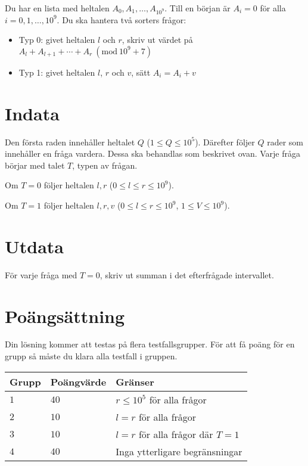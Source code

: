 \newcommand{\Mod}[1]{\ (\mathrm{mod}\ #1)}

Du har en lista med heltalen $A_0, A_1, \dots, A_{10^9}$. Till en början är $A_i=0$ för alla $i=0,1,\dots,10^9$.
Du ska hantera två sorters frågor:

\begin{itemize}
    \item Typ 0: givet heltalen $l$ och $r$, skriv ut värdet på  $A_l + A_{l+1} + \cdots + A_{r} \Mod{10^9+7}$
    \item Typ 1: givet heltalen $l$, $r$ och $v$, sätt $A_i=A_i+v$
\end{itemize}

\section*{Indata}
Den första raden innehåller heltalet $Q$ ($1 \leq Q \leq 10^5$).
Därefter följer $Q$ rader som innehåller en fråga vardera. Dessa ska behandlas som beskrivet ovan.
Varje fråga börjar med talet $T$, typen av frågan.

Om $T=0$ följer heltalen $l,r$ ($0 \leq l \leq r \leq 10^9$).

Om $T=1$ följer heltalen $l, r, v$ ($0 \leq l \leq r \leq 10^9$, $1 \leq V \leq 10^9$).

\section*{Utdata}
För varje fråga med $T=0$, skriv ut summan i det efterfrågade intervallet.

\section*{Poängsättning}
Din lösning kommer att testas på flera testfallsgrupper.
\noindent
För att få poäng för en grupp så måste du klara alla testfall i gruppen.

\noindent
\begin{tabular}{| l | l | l |}
\hline
  Grupp & Poängvärde & Gränser \\ \hline
  $1$    & $40$       &  $r \leq 10^5$ för alla frågor \\ \hline
  $2$    & $10$       &  $l=r$ för alla frågor \\ \hline
  $3$    & $10$       &  $l=r$ för alla frågor där $T=1$ \\ \hline
  $4$    & $40$       &  Inga ytterligare begränsningar \\ \hline
\end{tabular}
